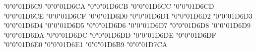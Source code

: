 {    \Umathchardef\theta     "0"0"01D6C9%
    \Umathchardef\iota      "0"0"01D6CA%
    \Umathchardef\kappa     "0"0"01D6CB%
    \Umathchardef\lambda    "0"0"01D6CC%
    \Umathchardef\mu        "0"0"01D6CD%
    \Umathchardef\nu        "0"0"01D6CE%
    \Umathchardef\xi        "0"0"01D6CF%
    \Umathchardef\omicron   "0"0"01D6D0%
    \Umathchardef\pi        "0"0"01D6D1%
    \Umathchardef\rho       "0"0"01D6D2%
    \Umathchardef\varsigma  "0"0"01D6D3%
    \Umathchardef\sigma     "0"0"01D6D4%
    \Umathchardef\tau       "0"0"01D6D5%
    \Umathchardef\upsilon   "0"0"01D6D6%
    \Umathchardef\varphi    "0"0"01D6D7%
    \Umathchardef\chi       "0"0"01D6D8%
    \Umathchardef\psi       "0"0"01D6D9%
    \Umathchardef\omega     "0"0"01D6DA%
    \Umathchardef\epsilon   "0"0"01D6DC%
    \Umathchardef\vartheta  "0"0"01D6DD%
    \Umathchardef\varkappa  "0"0"01D6DE%
    \Umathchardef\phi       "0"0"01D6DF%
    \Umathchardef\varrho    "0"0"01D6E0%
    \Umathchardef\varpi     "0"0"01D6E1%
    \Umathchardef\varTheta  "0"0"01D6B9%
    \Umathchardef\digamma   "0"0"01D7CA%
    \relax
}

